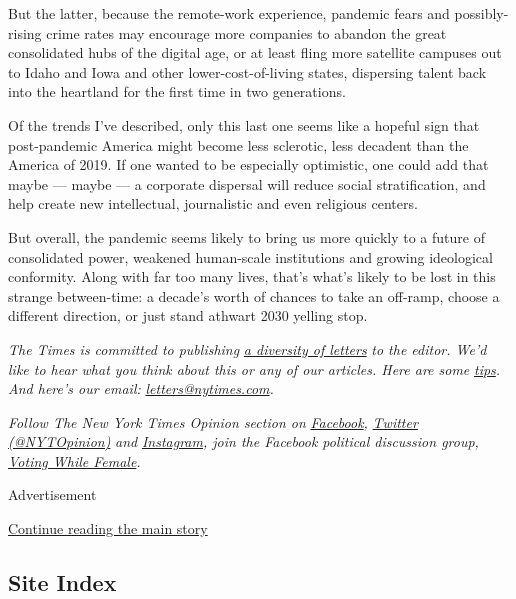But the latter, because the remote-work experience, pandemic fears and
possibly-rising crime rates may encourage more companies to abandon the
great consolidated hubs of the digital age, or at least fling more
satellite campuses out to Idaho and Iowa and other lower-cost-of-living
states, dispersing talent back into the heartland for the first time in
two generations.

Of the trends I've described, only this last one seems like a hopeful
sign that post-pandemic America might become less sclerotic, less
decadent than the America of 2019. If one wanted to be especially
optimistic, one could add that maybe --- maybe --- a corporate dispersal
will reduce social stratification, and help create new intellectual,
journalistic and even religious centers.

But overall, the pandemic seems likely to bring us more quickly to a
future of consolidated power, weakened human-scale institutions and
growing ideological conformity. Along with far too many lives, that's
what's likely to be lost in this strange between-time: a decade's worth
of chances to take an off-ramp, choose a different direction, or just
stand athwart 2030 yelling stop.

\emph{The Times is committed to publishing}
\href{https://www.nytimes.com/2019/01/31/opinion/letters/letters-to-editor-new-york-times-women.html}{\emph{a
diversity of letters}} \emph{to the editor. We'd like to hear what you
think about this or any of our articles. Here are some}
\href{https://help.nytimes.com/hc/en-us/articles/115014925288-How-to-submit-a-letter-to-the-editor}{\emph{tips}}\emph{.
And here's our email:}
\href{mailto:letters@nytimes.com}{\emph{letters@nytimes.com}}\emph{.}

\emph{Follow The New York Times Opinion section on}
\href{https://www.facebook.com/nytopinion}{\emph{Facebook}}\emph{,}
\href{http://twitter.com/NYTOpinion}{\emph{Twitter (@NYTOpinion)}}
\emph{and}
\href{https://www.instagram.com/nytopinion/}{\emph{Instagram}}\emph{,
join the Facebook political discussion group,}
\href{https://www.facebook.com/groups/votingwhilefemale/}{\emph{Voting
While Female}}\emph{.}

Advertisement

\protect\hyperlink{after-bottom}{Continue reading the main story}

\hypertarget{site-index}{%
\subsection{Site Index}\label{site-index}}

